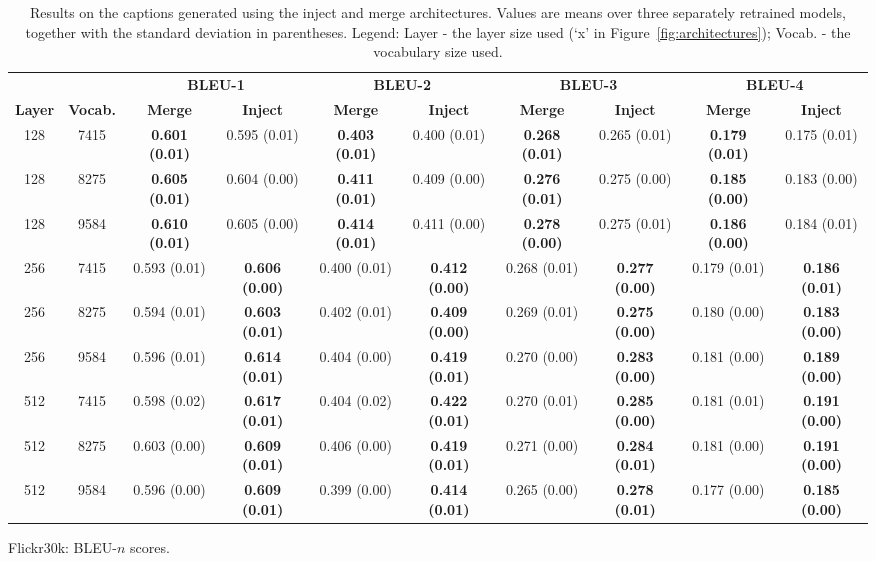 \documentclass[11pt,letterpaper]{article}
\begin{document}
\begin{table*}[!t]
\begin{scriptsize}
\begin{subtable}{\textwidth}
  \centering
  \begin{tabular}{|cc|cc|cc|cc|cc|}
  \hline
  & & \multicolumn{2}{|c|}{\bf BLEU-1} & \multicolumn{2}{|c|}{\bf BLEU-2} & \multicolumn{2}{|c|}{\bf BLEU-3} & \multicolumn{2}{|c|}{\bf BLEU-4} \\
  \bf Layer & \bf Vocab. & \bf Merge & \bf Inject & \bf Merge & \bf Inject & \bf Merge & \bf Inject & \bf Merge & \bf Inject \\
  \hline
  128	& 7415	& \bf 0.601 (0.01)	& 0.595 (0.01)	& \bf 0.403 (0.01)	& 0.400 (0.01)	& \bf 0.268 (0.01)	& 0.265 (0.01)	& \bf 0.179 (0.01)	& 0.175 (0.01) \\
  128	& 8275	& \bf 0.605 (0.01)	& 0.604 (0.00)	& \bf 0.411 (0.01)	& 0.409 (0.00)	& \bf 0.276 (0.01)	& 0.275 (0.00)	& \bf 0.185 (0.00)	& 0.183 (0.00) \\
  128	& 9584	& \bf 0.610 (0.01)	& 0.605 (0.00)	& \bf 0.414 (0.01)	& 0.411 (0.00)	& \bf 0.278 (0.00)	& 0.275 (0.01)	& \bf 0.186 (0.00)	& 0.184 (0.01) \\
  \hline
  256	& 7415	& 0.593 (0.01)	& \bf 0.606 (0.00)	& 0.400 (0.01)	& \bf 0.412 (0.00)	& 0.268 (0.01)	& \bf 0.277 (0.00)	& 0.179 (0.01)	& \bf 0.186 (0.01) \\
  256	& 8275	& 0.594 (0.01)	& \bf 0.603 (0.01)	& 0.402 (0.01)	& \bf 0.409 (0.00)	& 0.269 (0.01)	& \bf 0.275 (0.00)	& 0.180 (0.00)	& \bf 0.183 (0.00) \\
  256	& 9584	& 0.596 (0.01)	& \bf 0.614 (0.01)	& 0.404 (0.00)	& \bf 0.419 (0.01)	& 0.270 (0.00)	& \bf 0.283 (0.00)	& 0.181 (0.00)	& \bf 0.189 (0.00) \\
  \hline
  512	& 7415	& 0.598 (0.02)	& \bf 0.617 (0.01)	& 0.404 (0.02)	& \bf 0.422 (0.01)	& 0.270 (0.01)	& \bf 0.285 (0.00)	& 0.181 (0.01)	& \bf 0.191 (0.00) \\
  512	& 8275	& 0.603 (0.00)	& \bf 0.609 (0.01)	& 0.406 (0.00)	& \bf 0.419 (0.01)	& 0.271 (0.00)	& \bf 0.284 (0.01)	& 0.181 (0.00)	& \bf 0.191 (0.00) \\
  512	& 9584	& 0.596 (0.00)	& \bf 0.609 (0.01)	& 0.399 (0.00)	& \bf 0.414 (0.01)	& 0.265 (0.00)	& \bf 0.278 (0.01)	& 0.177 (0.00)	& \bf 0.185 (0.00) \\
  \hline
  \end{tabular}
  \caption{\label{tbl:results_flickr30k_2} Flickr30k: BLEU-$n$ scores.}
\end{subtable}
\vspace{10pt}

\end{scriptsize}
\caption{\label{tbl:results} Results on the captions generated using the inject and merge architectures. Values are means over three separately retrained models, together with the standard deviation in parentheses. Legend: Layer - the layer size used (`x' in Figure~\ref{fig:architectures}); Vocab. - the vocabulary size used.}
\end{table*}
\end{document}
